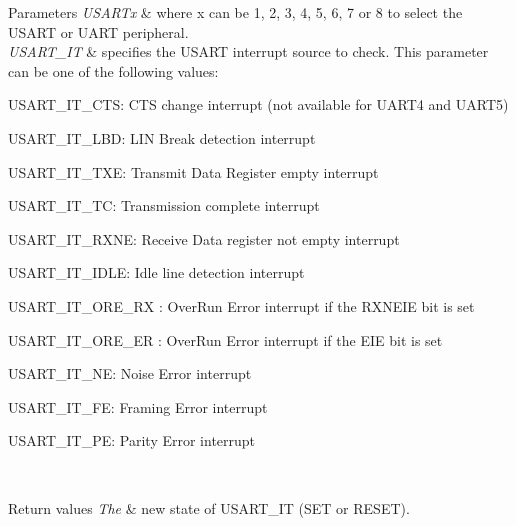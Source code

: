 \begin{DoxyParams}{Parameters}
{\em U\+S\+A\+R\+Tx} & where x can be 1, 2, 3, 4, 5, 6, 7 or 8 to select the U\+S\+A\+RT or U\+A\+RT peripheral. \\
\hline
{\em U\+S\+A\+R\+T\+\_\+\+IT} & specifies the U\+S\+A\+RT interrupt source to check. This parameter can be one of the following values\+: \begin{DoxyItemize}
\item U\+S\+A\+R\+T\+\_\+\+I\+T\+\_\+\+C\+TS\+: C\+TS change interrupt (not available for U\+A\+R\+T4 and U\+A\+R\+T5) \item U\+S\+A\+R\+T\+\_\+\+I\+T\+\_\+\+L\+BD\+: L\+IN Break detection interrupt \item U\+S\+A\+R\+T\+\_\+\+I\+T\+\_\+\+T\+XE\+: Transmit Data Register empty interrupt \item U\+S\+A\+R\+T\+\_\+\+I\+T\+\_\+\+TC\+: Transmission complete interrupt \item U\+S\+A\+R\+T\+\_\+\+I\+T\+\_\+\+R\+X\+NE\+: Receive Data register not empty interrupt \item U\+S\+A\+R\+T\+\_\+\+I\+T\+\_\+\+I\+D\+LE\+: Idle line detection interrupt \item U\+S\+A\+R\+T\+\_\+\+I\+T\+\_\+\+O\+R\+E\+\_\+\+RX \+: Over\+Run Error interrupt if the R\+X\+N\+E\+IE bit is set \item U\+S\+A\+R\+T\+\_\+\+I\+T\+\_\+\+O\+R\+E\+\_\+\+ER \+: Over\+Run Error interrupt if the E\+IE bit is set ~\newline
 \item U\+S\+A\+R\+T\+\_\+\+I\+T\+\_\+\+NE\+: Noise Error interrupt \item U\+S\+A\+R\+T\+\_\+\+I\+T\+\_\+\+FE\+: Framing Error interrupt \item U\+S\+A\+R\+T\+\_\+\+I\+T\+\_\+\+PE\+: Parity Error interrupt \end{DoxyItemize}
\\
\hline
\end{DoxyParams}

\begin{DoxyRetVals}{Return values}
{\em The} & new state of U\+S\+A\+R\+T\+\_\+\+IT (S\+ET or R\+E\+S\+ET). \\
\hline
\end{DoxyRetVals}
\mbox{\label{group___u_s_a_r_t___group9_ga6d8f2dd1f34060ae7e386e3e5d56b6f6}} 
